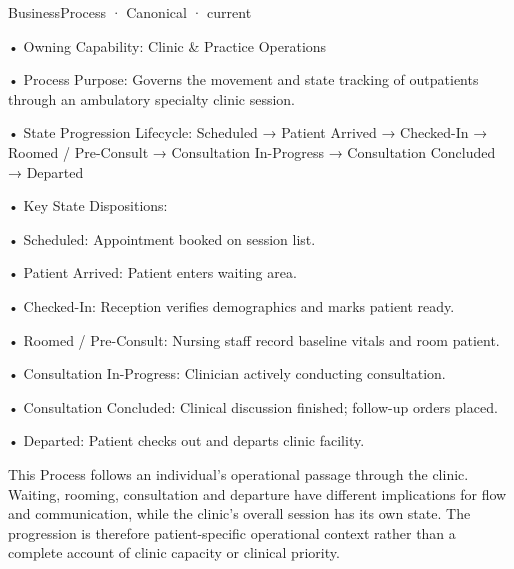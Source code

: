 \label{navigation:III.4.13.2.1.3.3.1}

\label{element:319d6956276a4cdeb43e350e1b01d078}
{\small BusinessProcess · Canonical · current}\par

•
Owning Capability: Clinic \& Practice Operations



•
Process Purpose: Governs the movement and state tracking of outpatients through an ambulatory specialty clinic session.



•
State Progression Lifecycle: Scheduled → Patient Arrived → Checked-In → Roomed / Pre-Consult → Consultation In-Progress → Consultation Concluded → Departed



•
Key State Dispositions:



•
Scheduled: Appointment booked on session list.



•
Patient Arrived: Patient enters waiting area.



•
Checked-In: Reception verifies demographics and marks patient ready.



•
Roomed / Pre-Consult: Nursing staff record baseline vitals and room patient.



•
Consultation In-Progress: Clinician actively conducting consultation.



•
Consultation Concluded: Clinical discussion finished; follow-up orders placed.



•
Departed: Patient checks out and departs clinic facility.



This Process follows an individual's operational passage through the clinic. Waiting, rooming, consultation and departure have different implications for flow and communication, while the clinic's overall session has its own state. The progression is therefore patient-specific operational context rather than a complete account of clinic capacity or clinical priority.


